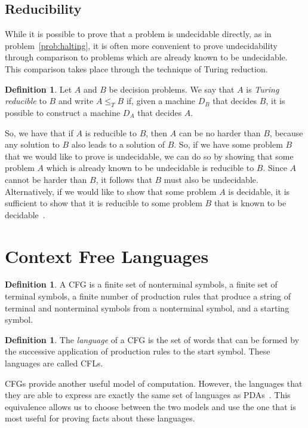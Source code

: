 \documentclass[psamsfonts]{amsart}
\theoremstyle{definition}
\newtheorem{defn}[thm]{Definition}
\theoremstyle{remark}
\numberwithin{equation}{section}
\begin{document}
\subsection{Reducibility}
\label{subsec:reducibility}
While it is possible to prove that a problem is undecidable directly, as in
problem~\ref{prob:halting}, it is often more convenient to prove undecidability
through comparison to problems which are already known to be undecidable. This
comparison takes place through the technique of Turing reduction.
\begin{defn}
  Let $A$ and $B$ be decision problems. We say that $A$ is \emph{Turing reducible}
  to $B$ and write $A \leq_T B$ if, given a machine $D_B$ that decides $B$, it is possible to construct
  a machine $D_A$ that decides $A$.
\end{defn}
So, we have that if $A$ is reducible to $B$, then $A$ can be no harder than $B$,
because any solution to $B$ also leads to a solution of $B$. So, if we have some
problem $B$ that we would like to prove is undecidable, we can do so by showing
that some problem $A$ which is already known to be undecidable is reducible to
$B$. Since $A$ cannot be harder than $B$, it follows that $B$ must also be
undecidable. Alternatively, if we would like to show that some problem $A$ is
decidable, it is sufficient to show that it is reducible to some problem $B$
that is known to be decidable~\cite{sipser13:_introd_theor_comput,post44:_recur,kleene80_introd}.

\section{Context Free Languages}

\begin{defn}
 A \ac{CFG} is a finite set of nonterminal symbols, a finite set of terminal
 symbols, a finite number of production rules that produce a string of terminal
 and nonterminal symbols from a nonterminal symbol, and a starting symbol.
\end{defn}

\begin{defn}
  The \emph{language} of a \ac{CFG} is the set of words that can be formed by
  the successive application of production rules to the start symbol. These
  languages are called \acp{CFL}.
\end{defn}

\acp{CFG} provide another useful model of computation. However, the languages
that they are able to
express are exactly the same set of languages as \acp{PDA}~\cite{hopcroft07:_introd_autom_theor_languag_comput}. This equivalence allows
us to choose between the two models and use the one that is most useful for
proving facts about these languages.
\end{document}
